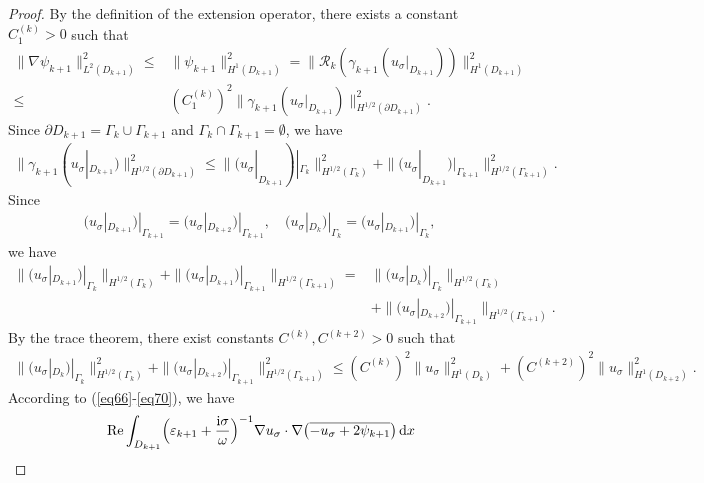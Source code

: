 \documentclass[12pt,reqno]{amsart}
\numberwithin{equation}{section}
\begin{document}
\begin{proof}
By the definition of the extension operator, there exists a constant $C_1^{(k)} > 0$ such that
\begin{equation}\label{eq67}
\begin{aligned}
\|\nabla\psi_{k+1}\|^2_{L^2(D_{k+1})}\leq&\|\psi_{k+1}\|^2_{H^1(D_{k+1})}=\|\mathcal{R}_k(\gamma_{k+1}(u_\sigma|_{D_{k+1}}))\|^2_{H^1(D_{k+1})}\\
\leq&(C_1^{(k)})^2\|\gamma_{k+1}(u_\sigma|_{D_{k+1}})\|^2_{H^{1/2}(\partial D_{k+1})}.
\end{aligned}
\end{equation}
Since $\partial D_{k+1}=\Gamma_k\cup\Gamma_{k+1}$ and $\Gamma_k\cap\Gamma_{k+1}=\emptyset$, we have
\begin{align}\label{eq68}
\|\gamma_{k+1}(u_\sigma|_{D_{k+1}})\|^2_{H^{1/2}(\partial D_{k+1})}\leq\|(u_\sigma|_{D_{k+1}})|_{\Gamma_k}\|^2_{H^{1/2}(\Gamma_k)}+\|(u_\sigma|_{D_{k+1}})|_{\Gamma_{k+1}}\|^2_{H^{1/2}(\Gamma_{k+1})}.
\end{align}
Since
\begin{align*}
(u_\sigma|_{D_{k+1}})|_{\Gamma_{k+1}}=(u_\sigma|_{D_{k+2}})|_{\Gamma_{k+1}},\quad (u_\sigma|_{D_{k}})|_{\Gamma_{k}}=(u_\sigma|_{D_{k+1}})|_{\Gamma_{k}},
\end{align*}
we have
\begin{equation}\label{eq69}
\begin{aligned}
\|(u_\sigma|_{D_{k+1}})|_{\Gamma_k}\|_{H^{1/2}(\Gamma_k)}+\|(u_\sigma|_{D_{k+1}})|_{\Gamma_{k+1}}\|_{H^{1/2}(\Gamma_{k+1})}=&\|(u_\sigma|_{D_{k}})|_{\Gamma_k}\|_{H^{1/2}(\Gamma_k)}\\
&+\|(u_\sigma|_{D_{k+2}})|_{\Gamma_{k+1}}\|_{H^{1/2}(\Gamma_{k+1})}.
\end{aligned}
\end{equation}
By the trace theorem, there exist constants $C^{(k)}, C^{(k+2)} > 0$ such that
\begin{align}\label{eq70}
\|(u_\sigma|_{D_{k}})|_{\Gamma_k}\|^2_{H^{1/2}(\Gamma_k)}+\|(u_\sigma|_{D_{k+2}})|_{\Gamma_{k+1}}\|^2_{H^{1/2}(\Gamma_{k+1})}\leq (C^{(k)})^2\|u_\sigma\|^2_{H^1(D_{k})}+(C^{(k+2)})^2\|u_\sigma\|^2_{H^1(D_{k+2})}.
\end{align}
According to (\ref{eq66}-\ref{eq70}), we have
\begin{equation}\label{eq71}
\begin{aligned}
&\operatorname{Re} \int_{D_{k+1}} \Bigl( \varepsilon_{k+1} + \frac{{\rm i}\sigma}{\omega} \Bigr)^{-1}
    \nabla u_\sigma \cdot \nabla \bigl( \overline{-u_\sigma+2\psi_{k+1}} \bigr) \, {\rm d}x\\

\end{aligned}
\end{equation}
\end{proof}
\end{document}
